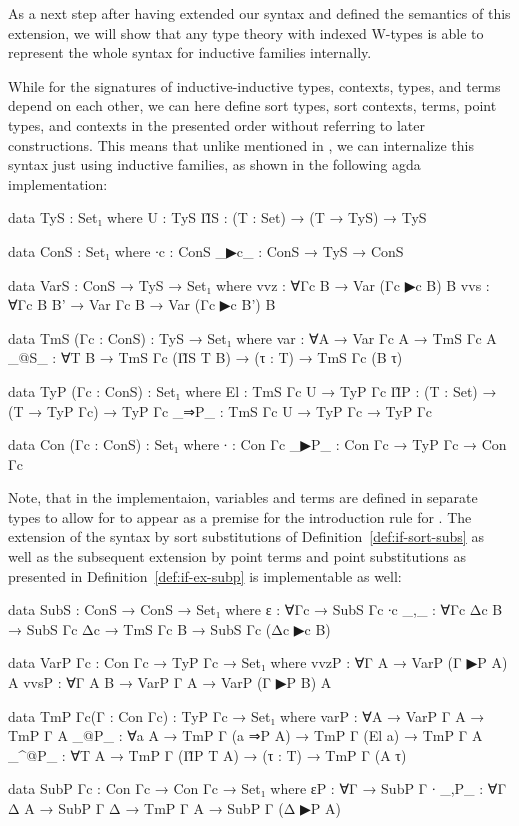 
As a next step after having extended our syntax and defined the semantics of this
extension, we will show that any type theory with indexed W-types is able
to represent the whole syntax for inductive families internally.

\begin{remark}\label{rmk:if-impl}
While for the signatures of inductive-inductive types, contexts, types, and terms
depend on each other, we can here define sort types, sort contexts, terms, point
types, and contexts in the presented order without referring to later constructions.
This means that unlike mentioned in , we  can
internalize this syntax just using inductive families, as shown in the
following agda implementation:
\begin{agdacodebr}
data TyS : Set₁ where
  U  : TyS
  Π̂S : (T : Set) → (T → TyS) → TyS

data ConS : Set₁ where
  ∙c   : ConS
  _▶c_ : ConS → TyS → ConS

data VarS : ConS → TyS → Set₁ where
  vvz : ∀{Γc B} → Var (Γc ▶c B) B
  vvs : ∀{Γc B B'} → Var Γc B → Var (Γc ▶c B') B

data TmS (Γc : ConS) : TyS → Set₁ where
  var  : ∀{A} → Var Γc A → TmS Γc A
  _@S_ : ∀{T B} → TmS Γc (Π̂S T B) → (τ : T) → TmS Γc (B τ)

data TyP (Γc : ConS) : Set₁ where
  El   : TmS Γc U → TyP Γc
  Π̂P   : (T : Set) → (T → TyP Γc) → TyP Γc
  _⇒P_ : TmS Γc U → TyP Γc → TyP Γc

data Con (Γc : ConS) : Set₁ where
  ∙    : Con Γc
  _▶P_ : Con Γc → TyP Γc → Con Γc
\end{agdacodebr}
Note, that in the implementaion, variables and terms are defined in separate
types to allow for  to appear as a premise for the introduction rule
for .
The extension of the syntax by sort substitutions of Definition~\ref{def:if-sort-subs}
as well as the subsequent extension by point terms and point substitutions as presented in
Definition~\ref{def:if-ex-subp} is implementable as well:
\begin{agdacodebr}
data SubS : ConS → ConS → Set₁ where
  ε   : ∀{Γc} → SubS Γc ∙c
  _,_ : ∀{Γc Δc B} → SubS Γc Δc → TmS Γc B → SubS Γc (Δc ▶c B)

data VarP {Γc} : Con Γc → TyP Γc → Set₁ where
  vvzP : ∀{Γ A} → VarP (Γ ▶P A) A
  vvsP : ∀{Γ A B} → VarP Γ A → VarP (Γ ▶P B) A

data TmP {Γc}(Γ : Con Γc) : TyP Γc → Set₁ where
  varP : ∀{A} → VarP Γ A → TmP Γ A
  _@P_ : ∀{a A} → TmP Γ (a ⇒P A) → TmP Γ (El a) → TmP Γ A
  _^@P_ : ∀{T A} → TmP Γ (Π̂P T A) → (τ : T) → TmP Γ (A τ)

data SubP {Γc} : Con Γc → Con Γc → Set₁ where
  εP   : ∀{Γ} → SubP Γ ∙
  _,P_ : ∀{Γ Δ A} → SubP Γ Δ → TmP Γ A → SubP Γ (Δ ▶P A)
\end{agdacodebr}
\end{remark}

